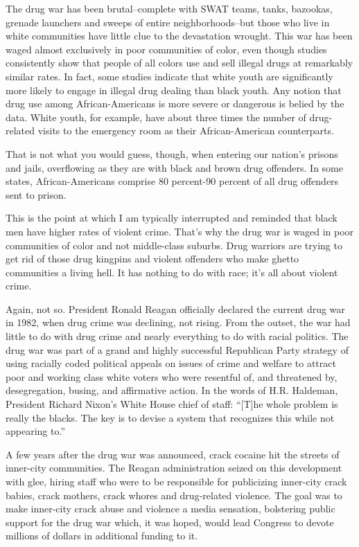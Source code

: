 \documentclass[10pt,a4paper]{article}
\begin{document}
The drug war has been brutal–complete with SWAT teams, tanks, bazookas, grenade launchers and sweeps of entire neighborhoods–but those who live in white communities have little clue to the devastation wrought. This war has been waged almost exclusively in poor communities of color, even though studies consistently show that people of all colors use and sell illegal drugs at remarkably similar rates. In fact, some studies indicate that white youth are significantly more likely to engage in illegal drug dealing than black youth. Any notion that drug use among African-Americans is more severe or dangerous is belied by the data. White youth, for example, have about three times the number of drug-related visits to the emergency room as their African-American counterparts.

That is not what you would guess, though, when entering our nation’s prisons and jails, overflowing as they are with black and brown drug offenders. In some states, African-Americans comprise 80 percent-90 percent of all drug offenders sent to prison.

This is the point at which I am typically interrupted and reminded that black men have higher rates of violent crime. That’s why the drug war is waged in poor communities of color and not middle-class suburbs. Drug warriors are trying to get rid of those drug kingpins and violent offenders who make ghetto communities a living hell. It has nothing to do with race; it’s all about violent crime.

Again, not so. President Ronald Reagan officially declared the current drug war in 1982, when drug crime was declining, not rising. From the outset, the war had little to do with drug crime and nearly everything to do with racial politics. The drug war was part of a grand and highly successful Republican Party strategy of using racially coded political appeals on issues of crime and welfare to attract poor and working class white voters who were resentful of, and threatened by, desegregation, busing, and affirmative action. In the words of H.R. Haldeman, President Richard Nixon’s White House chief of staff: “[T]he whole problem is really the blacks. The key is to devise a system that recognizes this while not appearing to.”

A few years after the drug war was announced, crack cocaine hit the streets of inner-city communities. The Reagan administration seized on this development with glee, hiring staff who were to be responsible for publicizing inner-city crack babies, crack mothers, crack whores and drug-related violence. The goal was to make inner-city crack abuse and violence a media sensation, bolstering public support for the drug war which, it was hoped, would lead Congress to devote millions of dollars in additional funding to it.
\end{document}
